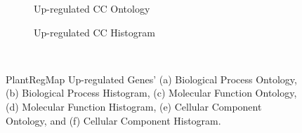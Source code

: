 \documentclass[12pt,letterpaper]{article}
\begin{document}
\begin{figure}[H]
\begin{subfigure}[b]{0.48\textwidth}
    \centering
    \caption{Up-regulated CC Ontology}
    \label{fig:enter-label}
\end{subfigure}
\begin{subfigure}[b]{0.48\textwidth}
    \centering
    \caption{Up-regulated CC Histogram}
    \label{fig:enter-label}
\end{subfigure}\
\caption{PlantRegMap Up-regulated Genes' (a) Biological Process Ontology, (b) Biological Process Histogram, (c) Molecular Function Ontology, (d) Molecular Function Histogram, (e) Cellular Component Ontology, and (f) Cellular Component Histogram.}
\end{figure}
\end{document}
